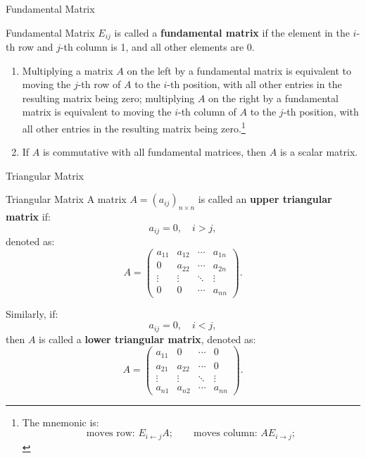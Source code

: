 \documentclass[11pt]{../../TexTemplate/elegantbook} %
\begin{document}
\begin{leftbarTitle}{Fundamental Matrix}\end{leftbarTitle}
\begin{definition}{Fundamental Matrix}
    \(E_{ij}\) is called a \textbf{fundamental matrix} if the element in the \(i\)-th row and \(j\)-th column is 1,
    and all other elements are 0.
\end{definition}

\begin{property}
    \begin{enumerate}
        \item Multiplying a matrix \(A\) on the left by a fundamental matrix is equivalent to 
            moving the \(j\)-th row of \(A\) to the \(i\)-th position, 
            with all other entries in the resulting matrix being zero; 
            multiplying \(A\) on the right by a fundamental matrix is equivalent to 
            moving the \(i\)-th column of \(A\) to the \(j\)-th position, 
            with all other entries in the resulting matrix being zero.\footnote{
                The mnemonic is:
                \[
                \text{moves row: }E_{i\leftarrow j}A;\qquad
                \text{moves column: }AE_{i\rightarrow j};
                \]
            }
        \item If \(A\) is commutative with all fundamental matrices, then \(A\) is a scalar matrix.
    \end{enumerate}
\end{property}

\begin{leftbarTitle}{Triangular Matrix}\end{leftbarTitle}
\begin{definition}{Triangular Matrix}
    A matrix \( A = (a_{ij})_{n \times n} \) is called an \textbf{upper triangular matrix} if:
    \[
    a_{ij} = 0, \quad i > j,
    \]
    denoted as:
    \[
    A = 
    \begin{pmatrix}
    a_{11} & a_{12} & \cdots & a_{1n} \\
    0 & a_{22} & \cdots & a_{2n} \\
    \vdots & \vdots & \ddots & \vdots \\
    0 & 0 & \cdots & a_{nn}
    \end{pmatrix}.
    \]

    Similarly, if:
    \[
    a_{ij} = 0, \quad i < j,
    \]
    then \( A \) is called a \textbf{lower triangular matrix},
    denoted as:
    \[
    A = 
    \begin{pmatrix}
    a_{11} & 0 & \cdots & 0 \\
    a_{21} & a_{22} & \cdots & 0 \\
    \vdots & \vdots & \ddots & \vdots \\
    a_{n1} & a_{n2} & \cdots & a_{nn}
    \end{pmatrix}.
    \]
\end{definition}
\end{document}
